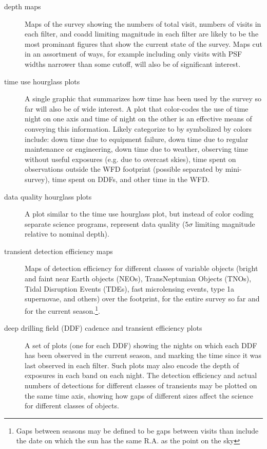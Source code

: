 \begin{description}
\item[{depth maps}] Maps of the survey showing the numbers of total visit, numbers of visits in each filter, and coadd limiting magnitude in each filter are likely to be the most prominant figures that show the current state of the survey. Maps cut in an assortment of ways, for example including only visits with PSF widths narrower than some cutoff, will also be of significant interest.
\item[{time use hourglass plots}] A single graphic that summarizes how time has been used by the survey so far will also be of wide interest. A plot that color-codes the use of time night on one axis and time of night on the other is an effective means of conveying this information. Likely categorize to by symbolized by colors include: down time due to equipment failure, down time due to regular maintenance or engineering, down time due to weather, observing time without useful exposures (e.g. due to overcast skies), time spent on observations outside the WFD footprint (possible separated by mini-survey), time spent on DDFs, and other time in the WFD.
\item[{data quality hourglass plots}] A plot similar to the time use hourglass plot, but instead of color coding separate science programs, represent data quality (\(5\sigma\) limiting magnitude relative to nominal depth).
\item[{transient detection efficiency maps}] Maps of detection efficiency for different classes of variable objects (bright and faint near Earth objects (NEOs), TransNeptunian Objects (TNOs), Tidal Disruption Events (TDEs), fast microlensing events, type 1a supernovae, and others) over the footprint, for the entire survey so far and for the current season.\footnote{Gaps between seasons may be defined to be gaps between visits than include the date on which the sun has the same R.A. as the point on the sky}.
\item[{deep drilling field (DDF) cadence and transient efficiency plots}] A set of plots (one for each DDF) showing the nights on which each DDF has been observed in the current season, and marking the time since it was last observed in each filter. Such plots may also encode the depth of exposures in each band on each night. The detection efficiency and actual numbers of detections for different classes of transients may be plotted on the same time axis, showing how gaps of different sizes affect the science for different classes of objects.
\end{description}


